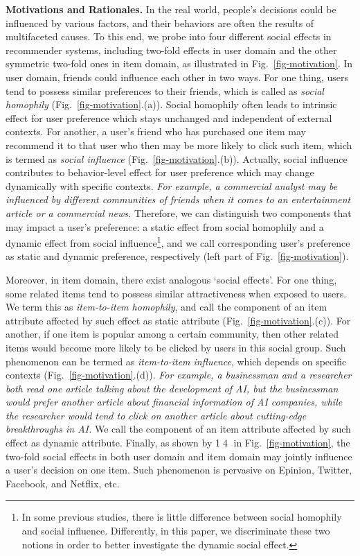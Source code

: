 \documentclass[sigconf]{acmart}
\begin{document}
\textbf{Motivations and Rationales.} 
In the real world, people's decisions could be influenced by various factors, and their behaviors are often the results of multifaceted causes. 
To this end, we probe into four different social effects in recommender systems, including two-fold effects in user domain and the other symmetric two-fold ones in item domain, as illustrated in Fig.~\ref{fig-motivation}. 
In user domain,
friends could influence each other in two ways. 
For one thing, users tend to possess similar preferences to their friends, which is called as \emph{social homophily} \cite{Homophily} (Fig.~\ref{fig-motivation}.(a)). 
Social homophily often leads to intrinsic effect for user preference which stays unchanged and independent of external contexts. 
For another, a user's friend who has purchased one item may recommend it to that user who then may be more likely to click such item, which is termed as \emph{social influence} \cite{Influence} (Fig.~\ref{fig-motivation}.(b)). Actually,
social influence contributes to behavior-level effect for user preference which may change dynamically with specific contexts. 
\emph{For example, a commercial analyst may be influenced by different communities of friends when it comes to an entertainment article or a commercial news.} 
Therefore, we can distinguish two components that may impact a user's preference: a static effect from social homophily and a dynamic effect from social influence\footnote{In some previous studies, there is little difference between social homophily and social influence. Differently, in this paper, we discriminate these two notions in order to better investigate the dynamic social effect.}, and we call corresponding user's preference as static and dynamic preference, respectively (left part of Fig.~\ref{fig-motivation}). 


Moreover, in item domain, there exist analogous `social effects'. 
For one thing, some related items tend to possess similar attractiveness when exposed to users. 
We term this as \emph{item-to-item homophily}, and call the component of an item attribute affected by such effect as static attribute (Fig.~\ref{fig-motivation}.(c)). 
For another, if one item is popular among a certain community, then other related items would become more likely to be clicked by users in this social group. 
Such phenomenon can be termed as \emph{item-to-item influence}, which depends on specific contexts (Fig.~\ref{fig-motivation}.(d)). 
\emph{For example, a businessman and a researcher both read one article talking about the development of AI, but the businessman would prefer another article about financial information of AI companies, while the researcher would tend to click on another article about cutting-edge breakthroughs in AI.} 
We call the component of an item attribute affected by such effect as dynamic attribute. 
Finally, as shown by \textcircled{1}\textcircled{4} in Fig.~\ref{fig-motivation}, the two-fold social effects in both user domain and item domain may jointly influence a user's decision on one item. Such phenomenon is pervasive on Epinion, Twitter, Facebook, and Netflix, etc.
\end{document}
